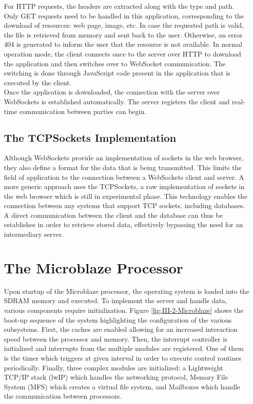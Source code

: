       For HTTP requests, the headers are extracted along with the type and path. Only GET requests need to be handled in this application, corresponding to the download of resources: web page, image, etc. In case the requested path is valid, the file is retrieved from memory and sent back to the user. Otherwise, an error 404 is generated to inform the user that the resource is not available. In normal operation mode, the client connects once to the server over HTTP to download the application and then switches over to WebSocket communication. The switching is done through JavaScript code present in the application that is executed by the client. \\

      Once the application is downloaded, the connection with the server over WebSockets is established automatically. The server registers the client and real-time communication between parties can begin.

    \subsection{The TCPSockets Implementation}

      Although WebSockets provide an implementation of sockets in the web browser, they also define a format for the data that is being transmitted. This limits the field of application to the connection between a WebSockets client and server. A more generic approach uses the TCPSockets, a raw implementation of sockets in the web browser which is still in experimental phase. This technology enables the connection between any systems that support TCP sockets, including databases. A direct communication between the client and the database can thus be establishes in order to retrieve stored data, effectively bypassing the need for an intermediary server.

  \section{The Microblaze Processor}

    Upon startup of the Microblaze processor, the operating system is loaded into the SDRAM memory and executed. To implement the server and handle data, various components require initialization. Figure \ref{fig:III-2-Microblaze} shows the boot-up sequence of the system highlighting the configuration of the various subsystems. First, the caches are enabled allowing for an increased interaction speed between the processor and memory. Then, the interrupt controller is initialized and interrupts from the multiple modules are registered. One of them is the timer which triggers at given interval in order to execute control routines periodically. Finally, three complex modules are initialized: a Lightweight TCP/IP stack (lwIP) which handles the networking protocol, Memory File System (MFS) which creates a virtual file system, and Mailboxes which handle the communication between processors.

